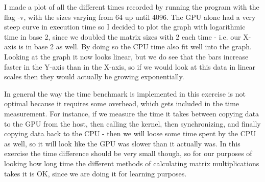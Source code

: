 \documentclass[a4paper, 12pt]{article}
\begin{document}
I made a plot of all the different times recorded by running the program with the flag -v, with the sizes varying from 64 up until 4096. The GPU alone had a very steep curve in execution time so I decided to plot the graph with logarithmic time in base 2, since we doubled the matrix sizes with 2 each time - i.e. our X-axis is in base 2 as well. By doing so the CPU time also fit well into the graph. Looking at the graph it now looks linear, but we do see that the bars increase faster in the Y-axis than in the X-axis, so if we would look at this data in linear scales then they would actually be growing exponentially.

In general the way the time benchmark is implemented in this exercise is not optimal because it requires some overhead, which gets included in the time measurement. For instance, if we measure the time it takes between copying data to the GPU from the host, then calling the kernel, then synchronizing, and finally copying data back to the CPU - then we will loose some time spent by the CPU as well, so it will look like the GPU was slower than it actually was. In this exercise the time difference should be very small though, so for our purposes of looking how long time the different methods of calculating matrix multiplications takes it is OK, since we are doing it for learning purposes. 

\end{document}
